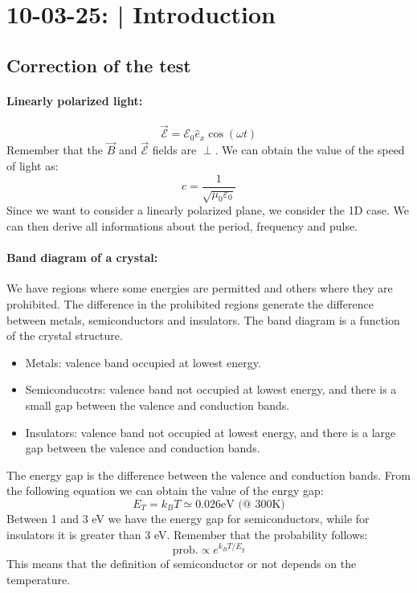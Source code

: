 \section{10-03-25: | Introduction}

\subsection{Correction of the test}

\paragraph{Linearly polarized light:} 
\begin{equation}
    \vec{\mathcal{E}} = \mathcal{E}_0 \hat{e}_x \cos(\omega t)
\end{equation}
Remember that the $\vec{B}$ and $\vec{\mathcal{E}}$ fields are $\perp$. We can obtain the value of the speed of light as:
\begin{equation}
    c = \frac{1}{\sqrt{\mu_0 \varepsilon_0}}
\end{equation}
Since we want to consider a linearly polarized plane, we consider the 1D case. We can then derive all informations about the period, frequency and pulse.

\paragraph{Band diagram of a crystal:} We have regions where some energies are permitted and others where they are prohibited. The difference in the prohibited regions generate the difference between metals, semiconductors and insulators. The band diagram is a function of the crystal structure.

\begin{itemize}
    \item Metals: valence band occupied at lowest energy.
    \item Semiconducotrs: valence band not occupied at lowest energy, and there is a small gap between the valence and conduction bands.
    \item Insulators: valence band not occupied at lowest energy, and there is a large gap between the valence and conduction bands.
\end{itemize}

\noindent The energy gap is the difference between the valence and conduction bands. From the following equation we can obtain the value of the enrgy gap:
\begin{equation}
    E_T = k_B T \simeq 0.026 \text{eV (@ 300K)} 
\end{equation}
Between 1 and 3 eV we have the energy gap for semiconductors, while for insulators it is greater than 3 eV. Remember that the probability follows:
\begin{equation}
    \text{prob.} \propto e^{k_BT / E_g}
\end{equation}
This means that the definition of semiconductor or not depends on the temperature.

